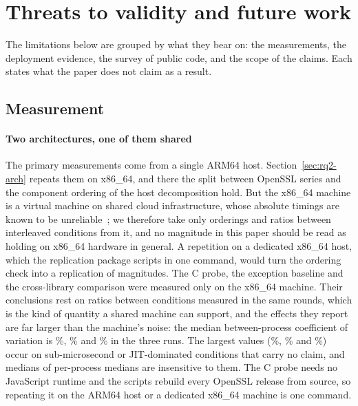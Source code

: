 \documentclass[preprint,12pt,authoryear]{elsarticle}
\begin{document}
\section{Threats to validity and future work}\label{sec:threats}

The limitations below are grouped by what they bear on: the measurements,
the deployment evidence, the survey of public code, and the scope of the
claims. Each states what the paper does not claim as a result.

\subsection{Measurement}\label{sec:threats-measure}

\paragraph{Two architectures, one of them shared} The primary measurements
come from a single ARM64 host. Section~\ref{sec:rq2-arch} repeats them on
x86\_64, and there the split between OpenSSL series and the component
ordering of the host decomposition hold. But the x86\_64 machine is a virtual machine on shared
cloud infrastructure, whose absolute timings are known to be
unreliable~\citep{laaber2019cloud}; we therefore take only orderings and ratios
between interleaved conditions from it, and no magnitude in this paper should
be read as holding on x86\_64 hardware in general. A repetition on a dedicated
x86\_64 host, which the replication package scripts in one command, would turn
the ordering check into a replication of magnitudes. The C probe, the exception
baseline and the cross-library comparison were measured only on the x86\_64
machine. Their conclusions rest on ratios between conditions measured in the
same rounds, which is the kind of quantity a shared machine can support, and
the effects they report are far larger than the machine's noise: the median
between-process coefficient of variation is \CProbeCvMedian\%,
\ExcCvMedian\% and \XlibCvMedian\% in the three runs. The largest values
(\CProbeCvMax\%, \ExcCvMax\% and \XlibCvMax\%) occur on sub-microsecond or
JIT-dominated conditions that carry no claim, and medians of per-process
medians are insensitive to them. The C probe needs no JavaScript runtime and
the scripts rebuild every OpenSSL release from source, so repeating it on the
ARM64 host or a dedicated x86\_64 machine is one command.
\end{document}
